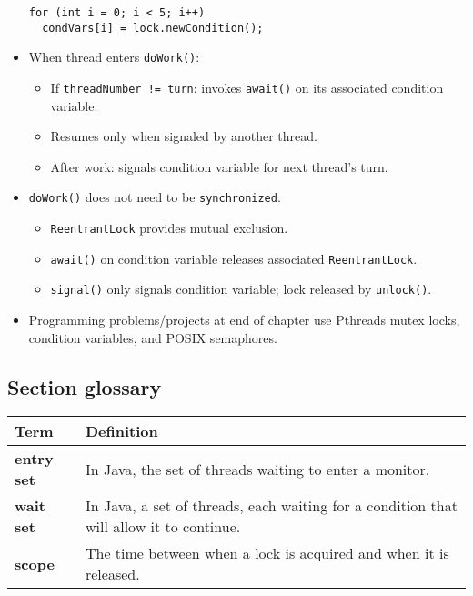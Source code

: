 \begin{itemize}
\begin{verbatim}
for (int i = 0; i < 5; i++)
  condVars[i] = lock.newCondition();
    \end{verbatim}
    \item When thread enters \texttt{doWork()}:
    \begin{itemize}
        \item If \texttt{threadNumber != turn}: invokes \texttt{await()} on its associated condition variable.
        \item Resumes only when signaled by another thread.
        \item After work: signals condition variable for next thread's turn.
    \end{itemize}
    \item \texttt{doWork()} does not need to be \texttt{synchronized}.
    \begin{itemize}
        \item \texttt{ReentrantLock} provides mutual exclusion.
        \item \texttt{await()} on condition variable releases associated \texttt{ReentrantLock}.
        \item \texttt{signal()} only signals condition variable; lock released by \texttt{unlock()}.
    \end{itemize}
    \item Programming problems/projects at end of chapter use Pthreads mutex locks, condition variables, and POSIX semaphores.
\end{itemize}

\subsection{Section glossary}
\centering
\begin{tabular}{>{\raggedright}p{} >{\raggedright\arraybackslash}p{}}
\toprule
\textbf{Term} & \textbf{Definition} \\
\midrule
\textbf{entry set} & In Java, the set of threads waiting to enter a monitor. \\
\textbf{wait set} & In Java, a set of threads, each waiting for a condition that will allow it to continue. \\
\textbf{scope} & The time between when a lock is acquired and when it is released. \\
\bottomrule
\end{tabular}
\vspace{\baselineskip}
